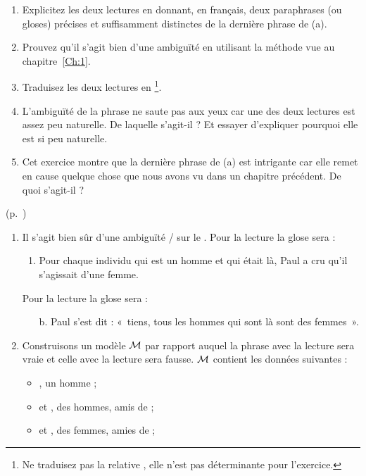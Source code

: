 \begin{exo}
\begin{enumerate}
\item Explicitez les deux lectures en donnant, en français, deux paraphrases (ou gloses) précises et suffisamment distinctes de la dernière phrase de (a).
\item Prouvez qu'il s'agit bien d'une ambiguïté en utilisant la méthode vue au chapitre~\ref{Ch:1}. %
\item Traduisez les deux lectures en \LO\footnote{Ne traduisez pas la relative , elle n'est pas déterminante pour l'exercice.}.
\item L'ambiguïté de la phrase ne saute pas aux yeux car une des deux lectures est assez peu naturelle. De laquelle s'agit-il ? Et essayer d'expliquer pourquoi elle est si peu naturelle. 
\item Cet exercice montre que la dernière phrase de (a) est intrigante car elle remet en cause quelque chose que nous avons vu dans un chapitre précédent. De quoi s'agit-il ?
\end{enumerate}
\begin{solu}(p.~\pageref{exo:homfem})\label{crg:homfem}
\begin{enumerate}
\item Il s'agit bien sûr d'une ambiguïté / sur le {\GN} .
Pour la lecture  la glose sera :
  \begin{enumerate}
  \item Pour chaque individu qui est un homme et qui était là, Paul a cru qu'il s'agissait d'une femme. 
  \end{enumerate}
Pour la lecture  la glose sera :
  \begin{enumerate}
  \item[b.] Paul s'est dit : «~tiens, tous les hommes qui sont là sont des femmes~».
  \end{enumerate}
\item Construisons un modèle $\mathcal{M}$ par rapport auquel la phrase avec la lecture  sera vraie et celle avec la lecture  sera fausse.  $\mathcal{M}$ contient les données suivantes :
\begin{itemize}
\item {}, un homme ;
\item {} et , des hommes, amis de  ;
\item {} et , des femmes, amies de  ;

\end{itemize}
\end{enumerate}
\end{solu}
\end{exo}
